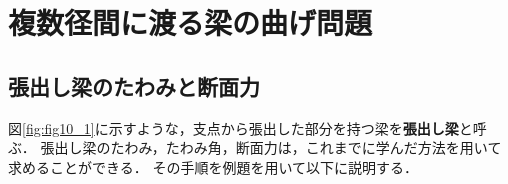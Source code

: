\documentclass[10pt,a4j]{jbook}
\newlength{\minitwocolumn}
\begin{document}
\newcommand{\fat}[1]{\mbox{\boldmath $#1$}}
\newcommand{\D}{\partial}
\newcommand{\w}{\omega}
\newcommand{\ga}{\alpha}
\newcommand{\gb}{\beta}
\newcommand{\gx}{\xi}
\newcommand{\gz}{\zeta}
\newcommand{\vhat}[1]{\hat{\fat{#1}}}
\newcommand{\spc}{\vspace{0.7\baselineskip}}
\newcommand{\halfspc}{\vspace{0.3\baselineskip}}

\newcommand{\twofig}[2]
 {
   \begin{figure}
     \begin{minipage}[t]{\minitwocolumn}
         \begin{center}   #1
         \end{center}
     \end{minipage}
         \hspace{\columnsep}
     \begin{minipage}[t]{\minitwocolumn}
         \begin{center} #2
         \end{center}
     \end{minipage}
   \end{figure}
 }
\setcounter{chapter}{6}
\chapter{複数径間に渡る梁の曲げ問題}
\section{張出し梁のたわみと断面力}
図\ref{fig:fig10_1}に示すような，支点から張出した部分を持つ梁を{\bf 張出し梁}と呼ぶ．
張出し梁のたわみ，たわみ角，断面力は，これまでに学んだ方法を用いて求めることができる．
その手順を例題を用いて以下に説明する．
\end{document}
